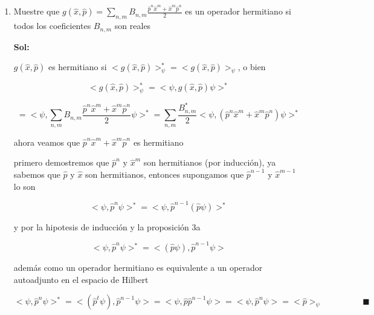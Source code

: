 \documentclass[12pt,a4paper]{article}
\begin{document}
\begin{enumerate}
    
    
    
    
    
    \item Muestre que $g(\hat{x},\hat{p}) = \sum_{n,m} B_{n,m} \frac{\hat{p}^{n}\hat{x}^{m}+ \hat{x}^{m}\hat{p}^{n}}{2}$ es un operador hermitiano si todos los coeficientes $B_{n,m}$ son reales
    
    \textbf{Sol:}
    
    $g(\hat{x},\hat{p})$ es hermitiano si $<g(\hat{x},\hat{p})>_{\psi}^{*} = <g(\hat{x},\hat{p})>_{\psi} $, o bien
    
    \begin{equation*}
        <g(\hat{x},\hat{p})>_{\psi}^{*} = <\psi, g(\hat{x},\hat{p}) \psi>^{*} 
    \end{equation*}
    
    \begin{equation}
        = <\psi, \sum_{n,m} B_{n,m} \frac{\hat{p}^{n}\hat{x}^{m}+ \hat{x}^{m}\hat{p}^{n}}{2}\psi>^{*} = \sum_{n,m} \frac{B_{n,m}^{*}}{2} <\psi, (\hat{p}^{n}\hat{x}^{m}+ \hat{x}^{m}\hat{p}^{n})\psi>^{*}  
    \end{equation}
    
    ahora veamos que $\hat{p}^{n}\hat{x}^{m}+ \hat{x}^{m}\hat{p}^{n}$ es hermitiano
    
    primero demostremos que $\hat{p}^{n}$ y $\hat{x}^{m}$ son hermitianos (por inducción), ya sabemos que $\hat{p}$ y $\hat{x}$ son hermitianos, entonces supongamos que $\hat{p}^{n-1}$ y $\hat{x}^{m-1}$ lo son
    
    \begin{equation*}
        <\psi,\hat{p}^{n} \psi>^* = <\psi,\hat{p}^{n-1}(\hat{p} \psi)>^*
    \end{equation*}
    
    y por la hipotesis de inducción y la proposición 3a
    
    \begin{equation*}
        <\psi,\hat{p}^{n} \psi>^* = <(\hat{p} \psi),\hat{p}^{n-1} \psi>
    \end{equation*}
    
    además como un operador hermitiano es equivalente a un operador autoadjunto en el espacio de Hilbert 
    
    \begin{equation*}
        <\psi,\hat{p}^{n} \psi>^* = <(\hat{p}^{t} \psi),\hat{p}^{n-1} \psi> = < \psi,\hat{p}\hat{p}^{n-1} \psi> = < \psi,\hat{p}^{n} \psi> = <\hat{p}>_{\psi} \hspace{2cm} \blacksquare
    \end{equation*}
    

\end{enumerate}
\end{document}
